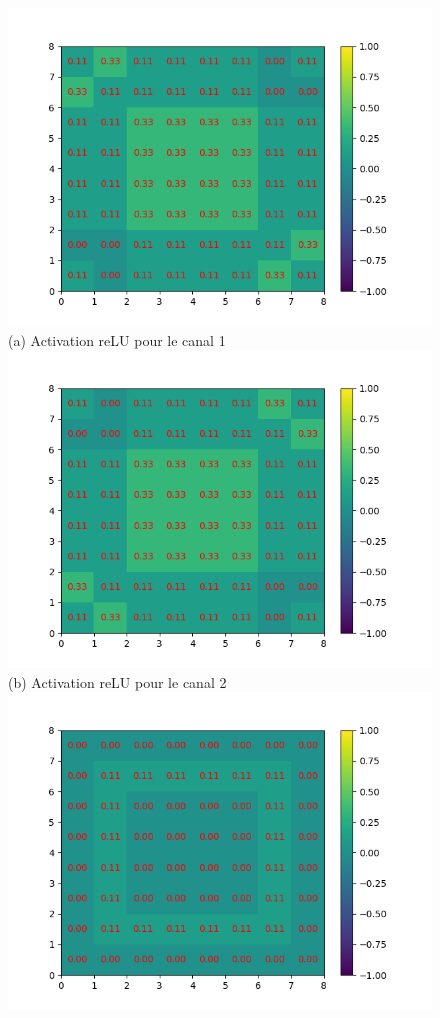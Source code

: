 \begin{figure}[h]
        \includegraphics[width=\textwidth]{img/cnn_exemple/square/activation_relu_1.png}
        \center 
        (a) Activation reLU pour le canal 1
    \endminipage\hfill
        \includegraphics[width=\textwidth]{img/cnn_exemple/square/activation_relu_2.png}
        \center 
        (b) Activation reLU pour le canal 2
    \endminipage\hfill
        \includegraphics[width=\textwidth]{img/cnn_exemple/square/activation_relu_3.png}

\end{figure}
